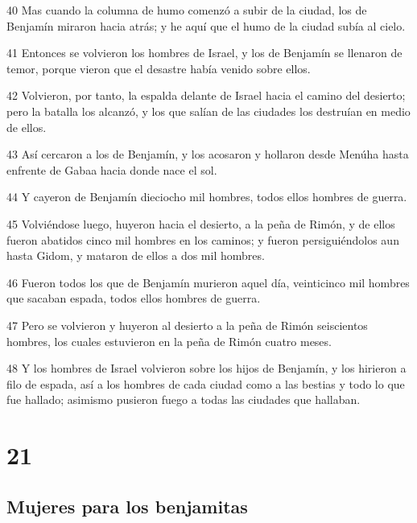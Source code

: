 \par 40 Mas cuando la columna de humo comenzó a subir de la ciudad, los de Benjamín miraron hacia atrás; y he aquí que el humo de la ciudad subía al cielo.
\par 41 Entonces se volvieron los hombres de Israel, y los de Benjamín se llenaron de temor, porque vieron que el desastre había venido sobre ellos.
\par 42 Volvieron, por tanto, la espalda delante de Israel hacia el camino del desierto; pero la batalla los alcanzó, y los que salían de las ciudades los destruían en medio de ellos.
\par 43 Así cercaron a los de Benjamín, y los acosaron y hollaron desde Menúha hasta enfrente de Gabaa hacia donde nace el sol. 
\par 44 Y cayeron de Benjamín dieciocho mil hombres, todos ellos hombres de guerra.
\par 45 Volviéndose luego, huyeron hacia el desierto, a la peña de Rimón, y de ellos fueron abatidos cinco mil hombres en los caminos; y fueron persiguiéndolos aun hasta Gidom, y mataron de ellos a dos mil hombres.
\par 46 Fueron todos los que de Benjamín murieron aquel día, veinticinco mil hombres que sacaban espada, todos ellos hombres de guerra.
\par 47 Pero se volvieron y huyeron al desierto a la peña de Rimón seiscientos hombres, los cuales estuvieron en la peña de Rimón cuatro meses.
\par 48 Y los hombres de Israel volvieron sobre los hijos de Benjamín, y los hirieron a filo de espada, así a los hombres de cada ciudad como a las bestias y todo lo que fue hallado; asimismo pusieron fuego a todas las ciudades que hallaban.

\chapter{21}

\section*{Mujeres para los benjamitas}

